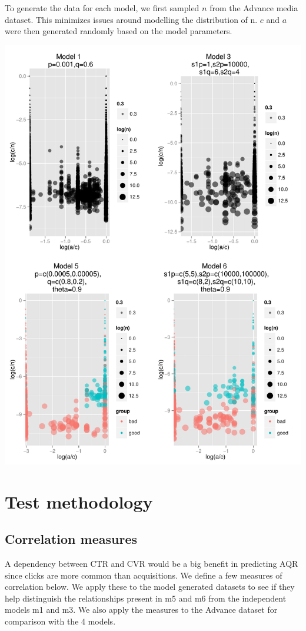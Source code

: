\documentclass[11pt,a4,singlespacing,titlepagenumber=on]{scrreprt}
\numberwithin{equation}{chapter} %
\theoremstyle{remark}
\begin{document}
To generate the data for each model, we first sampled $n$ from the Advance media dataset. This minimizes issues around modelling the distribution of n. $c$ and $a$ were then generated randomly based on the model parameters.

\includegraphics[scale=0.7]{SynthData}

\section{Test methodology} 

\subsection{ Correlation measures}

A dependency between CTR and CVR would be a big benefit in predicting AQR since clicks are more common than acquisitions. We define a few measures of correlation below. We apply these to the model generated datasets to see if they help distinguish the relationships present in m5 and m6 from the independent models m1 and m3. We also apply the measures to the Advance dataset for comparison with the 4 models.
\end{document}
